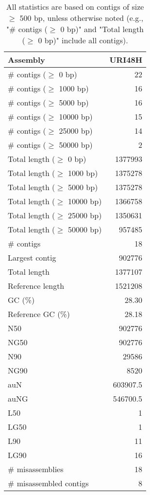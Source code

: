 \documentclass[12pt,a4paper]{article}
\begin{document}
\begin{table}[ht]
\begin{center}
\caption{All statistics are based on contigs of size $\geq$ 500 bp, unless otherwise noted (e.g., "\# contigs ($\geq$ 0 bp)" and "Total length ($\geq$ 0 bp)" include all contigs).}
\begin{tabular}{|l*{1}{|r}|}
\hline
Assembly & URI48H \\ \hline
\# contigs ($\geq$ 0 bp) & 22 \\ \hline
\# contigs ($\geq$ 1000 bp) & 16 \\ \hline
\# contigs ($\geq$ 5000 bp) & 16 \\ \hline
\# contigs ($\geq$ 10000 bp) & 15 \\ \hline
\# contigs ($\geq$ 25000 bp) & 14 \\ \hline
\# contigs ($\geq$ 50000 bp) & 2 \\ \hline
Total length ($\geq$ 0 bp) & 1377993 \\ \hline
Total length ($\geq$ 1000 bp) & 1375278 \\ \hline
Total length ($\geq$ 5000 bp) & 1375278 \\ \hline
Total length ($\geq$ 10000 bp) & 1366758 \\ \hline
Total length ($\geq$ 25000 bp) & 1350631 \\ \hline
Total length ($\geq$ 50000 bp) & 957485 \\ \hline
\# contigs & 18 \\ \hline
Largest contig & 902776 \\ \hline
Total length & 1377107 \\ \hline
Reference length & 1521208 \\ \hline
GC (\%) & 28.30 \\ \hline
Reference GC (\%) & 28.18 \\ \hline
N50 & 902776 \\ \hline
NG50 & 902776 \\ \hline
N90 & 29586 \\ \hline
NG90 & 8520 \\ \hline
auN & 603907.5 \\ \hline
auNG & 546700.5 \\ \hline
L50 & 1 \\ \hline
LG50 & 1 \\ \hline
L90 & 11 \\ \hline
LG90 & 16 \\ \hline
\# misassemblies & 18 \\ \hline
\# misassembled contigs & 8 \\ \hline

\end{tabular}
\end{center}
\end{table}
\end{document}

